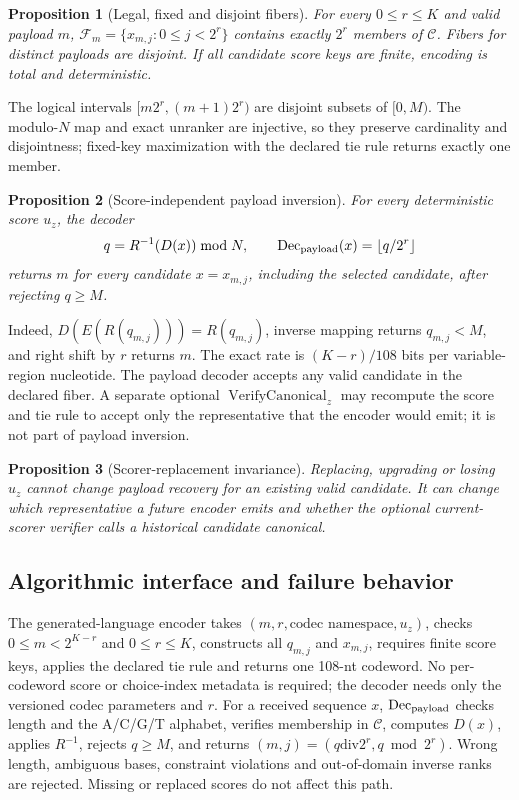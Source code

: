 \documentclass[10pt]{article}
\newtheorem{proposition}{Proposition}
\begin{document}
\begin{proposition}[Legal, fixed and disjoint fibers]
For every $0\leq r\leq K$ and valid payload $m$, $\mathcal F_m=\{x_{m,j}:0\leq j<2^r\}$ contains exactly $2^r$ members of $\mathcal C$. Fibers for distinct payloads are disjoint. If all candidate score keys are finite, encoding is total and deterministic.
\end{proposition}

\noindent
The logical intervals $[m2^r,(m+1)2^r)$ are disjoint subsets of $[0,M)$. The modulo-$N$ map and exact unranker are injective, so they preserve cardinality and disjointness; fixed-key maximization with the declared tie rule returns exactly one member.

\begin{proposition}[Score-independent payload inversion]
For every deterministic score $u_z$, the decoder
\[
 q=R^{-1}\!\left(D(x)\right)\bmod N,\qquad
 \operatorname{Dec}_{\rm payload}(x)=\left\lfloor q/2^r\right\rfloor
\]
returns $m$ for every candidate $x=x_{m,j}$, including the selected candidate, after rejecting $q\geq M$.
\end{proposition}

\noindent
Indeed, $D(E(R(q_{m,j})))=R(q_{m,j})$, inverse mapping returns $q_{m,j}<M$, and right shift by $r$ returns $m$. The exact rate is $(K-r)/108$ bits per variable-region nucleotide. The payload decoder accepts any valid candidate in the declared fiber. A separate optional $\operatorname{VerifyCanonical}_z$ may recompute the score and tie rule to accept only the representative that the encoder would emit; it is not part of payload inversion.

\begin{proposition}[Scorer-replacement invariance]
Replacing, upgrading or losing $u_z$ cannot change payload recovery for an existing valid candidate. It can change which representative a future encoder emits and whether the optional current-scorer verifier calls a historical candidate canonical.
\end{proposition}

\subsection{Algorithmic interface and failure behavior}

The generated-language encoder takes $(m,r,\text{codec namespace},u_z)$, checks $0\leq m<2^{K-r}$ and $0\leq r\leq K$, constructs all $q_{m,j}$ and $x_{m,j}$, requires finite score keys, applies the declared tie rule and returns one 108-nt codeword. No per-codeword score or choice-index metadata is required; the decoder needs only the versioned codec parameters and $r$. For a received sequence $x$, $\operatorname{Dec}_{\rm payload}$ checks length and the A/C/G/T alphabet, verifies membership in $\mathcal C$, computes $D(x)$, applies $R^{-1}$, rejects $q\geq M$, and returns $(m,j)=(q\mathbin{\mathrm{div}}2^r,q\bmod2^r)$. Wrong length, ambiguous bases, constraint violations and out-of-domain inverse ranks are rejected. Missing or replaced scores do not affect this path.
\end{document}
